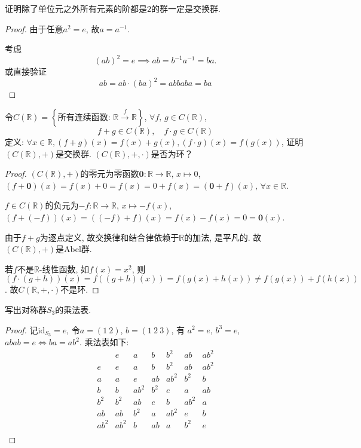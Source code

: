 \begin{problem}
    证明除了单位元之外所有元素的阶都是$2$的群一定是交换群.
\end{problem}

\begin{proof}
    由于任意$a^2 = e$, 故$a = a^{-1}$.

    考虑
\[
    (ab)^2 = e \implies ab = b^{-1}a^{-1} = ba.
\]
    或直接验证
\[
    ab = ab \cdot (ba)^2 = abbaba = ba
\]
\end{proof}

\begin{problem}
    令$C(\mathbb{R} ) = \left\{\text{所有连续函数: } \mathbb{R} \overset{f}\to \mathbb{R} \right\}$,
$\forall f ,\, g \in C(\mathbb{R})$,
\[
    f + g \in C(\mathbb{R}),\quad f \cdot g \in C(\mathbb{R})
\]
定义: $\forall x \in \mathbb{R}, (f + g)(x) = f(x) + g(x), (f \cdot g)(x) = f(g(x))$,
证明$(C(\mathbb{R}), +)$是交换群. $(C(\mathbb{R}), +, \cdot)$是否为环？
\end{problem}

\begin{proof}
    $(C(\mathbb{R}), +)$的零元为零函数$\mathbf{0}: \mathbb{R} \to \mathbb{R},\, x \mapsto 0$,
$(f + \mathbf{0})(x) = f(x) + 0 = f(x) = 0 + f(x) = (\mathbf{0} + f)(x),\, \forall x \in \mathbb{R}$.

    $f \in C(\mathbb{R})$的负元为$-f: \mathbb{R} \to \mathbb{R},\, x \mapsto -f(x)$,
$(f + (-f))(x) = ((-f) + f)(x) = f(x) - f(x) = 0 = \mathbf{0}(x)$.

    由于$f + g$为逐点定义, 故交换律和结合律依赖于$\mathbb{R}$的加法, 是平凡的.
故$(C(\mathbb{R}), +)$是Abel群.

    若$f$不是$\mathbb{R}$-线性函数, 如$f(x) = x^2$, 则$(f \cdot (g + h))(x) = f((g + h)(x)) = f(g(x) + h(x)) \neq f(g(x)) + f(h(x))$.
故$C(\mathbb{R}, +, \cdot)$不是环.
\end{proof}

\begin{problem}\label{ex:1.3.5}
    写出对称群$S_3$的乘法表.
\end{problem}

\begin{proof}
    记$\mathrm{id}_{S_3} = e$, 令$a = (1\:2)$, $b = (1\:2\:3)$, 有
$a^2 = e$, $b^3 = e$, $abab = e \iff ba = ab^2$. 乘法表如下: 
\[
\begin{array}{c|cccccc}
  & e   & a   & b   & b^2 & ab  & ab^2 \\
\hline
e  & e   & a   & b   & b^2 & ab  & ab^2 \\
a  & a   & e   & ab  & ab^2 & b^2 & b \\
b  & b   & ab^2 & b^2 & e   & a   & ab \\
b^2 & b^2 & ab  & e   & b   & ab^2 & a \\
ab & ab  & b^2 & a   & ab^2 & e   & b \\
ab^2 & ab^2 & b   & ab  & a   & b^2 & e \\
\end{array}
\]
\end{proof}

